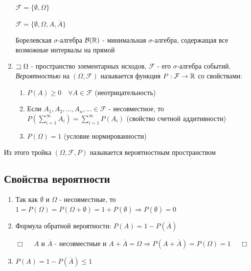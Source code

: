 \documentclass[12pt]{article}
\begin{document}
\begin{enumerate}
\begin{enumerate}
        \end{enumerate}

         $\mathcal{F} = \{\emptyset, \Omega\}$

         $\mathcal{F} = \{\emptyset, \Omega, A, \overline{A}\}$

         \Defs Борелевская $\sigma$-алгебра $\mathcal{B}(\mathbb{R})$ - минимальная $\sigma$-алгебра, содержащая все возможные интервалы на прямой


        \item \Defs $\mathord{\sqsupset}\ \Omega$ - пространство элементарных исходов, $\mathcal{F}$ - его $\sigma$-алгебра событий.
        \textit{Вероятностью} на $(\Omega, \mathcal{F})$ называется функция $P: \mathcal{F} \to \mathbb{R}$ со свойствами:

        \begin{enumerate}
            \item $P(A) \geq 0 \quad \forall A \in \mathcal{F}$ (неотрицательность)

            \item Если $A_1, A_2, \dots, A_n, \dots \in \mathcal{F}$ - несовместное, то $P(\sum_{i = 1}^\infty A_i) = \sum_{i = 1}^\infty P(A_i)$ (свойство счетной аддитивности)

            \item $P(\Omega) = 1$ (условие нормированности)
        \end{enumerate}

    \end{enumerate}

    \Def Из этого тройка $(\Omega, \mathcal{F}, P)$ называется вероятностным пространством

    \subsection{Свойства вероятности}

    \begin{enumerate}

        \item Так как $\emptyset$ и $\Omega$ - несовместные, то $1 = P(\Omega) = P(\Omega + \emptyset) = 1 + P(\emptyset) \Longrightarrow P(\emptyset) = 0$

        \item Формула обратной вероятности: $P(A) = 1 - P(\overline{A})$

        \begin{tcolorbox}
            $\Box \quad$ $A$ и $\overline{A}$ - несовместные и $A + \overline{A} = \Omega \Longrightarrow P(A + \overline{A}) = P(\Omega) = 1$ $\quad \Box$
        \end{tcolorbox}

        \item $P(A) = 1 - P(\overline{A}) \leq 1$

    \end{enumerate}
\end{document}
